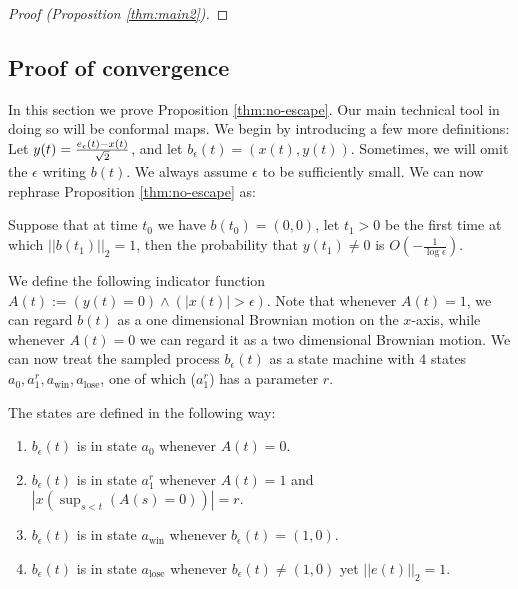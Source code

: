 {\begin{proof}[Proof (Proposition \ref{thm:main2})]
\end{proof}

\subsection{Proof of convergence}\label{sec:POC}
In this section we prove Proposition \ref{thm:no-escape}. Our main technical tool in doing so will
be conformal maps. We begin by introducing a few more definitions: Let
$y(t)=\frac{e_\epsilon(t)-x(t)}{\sqrt2}$, and let
${b}_\epsilon(t)=(x(t),y(t))$. Sometimes, we will omit the $\epsilon$ writing $b(t)$. We always assume $\epsilon$
to be sufficiently small. We can now rephrase Proposition
\ref{thm:no-escape} as:

\begin{propos}\label{prop:reph}
Suppose that at time $t_0$ we have
${b}(t_0)=(0,0)$, let $t_1>0$ be the first time at which
$||b(t_1)||_2=1$, then the probability that $y(t_1)\neq0$ is
$O\left(-\frac1{\log\epsilon}\right)$.
\end{propos}

We define the following indicator function
$A(t):=(y(t)=0)\wedge(|x(t)|>\epsilon)$. Note that whenever $A(t)=1$,
we can regard $b(t)$ as a one dimensional Brownian motion on the
$x$-axis, while whenever $A(t)=0$ we can regard it as a two
dimensional Brownian motion. We can now treat the sampled
process $b_\epsilon(t)$ as a state machine with $4$ states
$a_0,a^r_1,a_{\text{win}},a_{\text{lose}}$, one of which ($a^r_1$) has a parameter $r$.

The states are defined in the following way:
\begin{enumerate}
\item\label{n1} $b_\epsilon(t)$ is in state $a_0$ whenever $A(t)=0$.
\item\label{n2} $b_\epsilon(t)$ is in state $a^r_1$ whenever $A(t)=1$ and $|x(\sup_{s<t}(A(s)=0))|=r$.
\item\label{n3} $b_\epsilon(t)$ is in state $a_\text{win}$ whenever $b_\epsilon(t)=(1,0)$.
\item\label{n4} $b_\epsilon(t)$ is in state $a_\text{lose}$ whenever $b_\epsilon(t)\neq(1,0)$ yet $||e(t)||_2=1$.
\end{enumerate}

}
